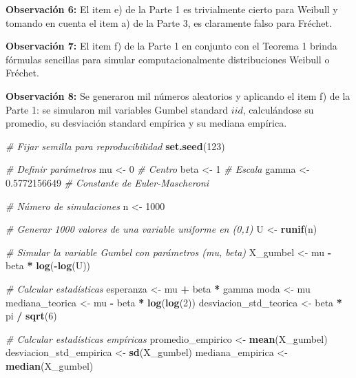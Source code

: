 \documentclass[
]{book}
\newenvironment{Shaded}{\begin{snugshade}}{\end{snugshade}}
\newcommand{\CommentTok}[1]{\textcolor[rgb]{0.56,0.35,0.01}{\textit{#1}}}
\newcommand{\DecValTok}[1]{\textcolor[rgb]{0.00,0.00,0.81}{#1}}
\newcommand{\FloatTok}[1]{\textcolor[rgb]{0.00,0.00,0.81}{#1}}
\newcommand{\FunctionTok}[1]{\textcolor[rgb]{0.13,0.29,0.53}{\textbf{#1}}}
\newcommand{\NormalTok}[1]{#1}
\newcommand{\OtherTok}[1]{\textcolor[rgb]{0.56,0.35,0.01}{#1}}
\newcommand{\SpecialCharTok}[1]{\textcolor[rgb]{0.81,0.36,0.00}{\textbf{#1}}}
\theoremstyle{definition}
\theoremstyle{definition}
\theoremstyle{definition}
\theoremstyle{definition}
\theoremstyle{remark}
\begin{document}
\textbf{Observación 6:} El item e) de la Parte 1 es
trivialmente cierto para Weibull y tomando en
cuenta el item a) de la Parte 3, es claramente falso
para Fréchet.

\textbf{Observación 7:} El item f) de la Parte 1 en
conjunto con el Teorema 1 brinda fórmulas
sencillas para simular computacionalmente
distribuciones Weibull o Fréchet.

\textbf{Observación 8:} Se generaron mil números aleatorios y aplicando el
item f) de la Parte 1: se simularon mil variables
Gumbel standard \(iid\), calculándose su promedio, su
desviación standard empírica y su mediana
empírica.

\begin{Shaded}
\begin{Highlighting}[]
\CommentTok{\# Fijar semilla para reproducibilidad}
\FunctionTok{set.seed}\NormalTok{(}\DecValTok{123}\NormalTok{)}

\CommentTok{\# Definir parámetros}
\NormalTok{mu }\OtherTok{\textless{}{-}} \DecValTok{0}       \CommentTok{\# Centro}
\NormalTok{beta }\OtherTok{\textless{}{-}} \DecValTok{1}     \CommentTok{\# Escala}
\NormalTok{gamma }\OtherTok{\textless{}{-}} \FloatTok{0.5772156649}  \CommentTok{\# Constante de Euler{-}Mascheroni}

\CommentTok{\# Número de simulaciones}
\NormalTok{n }\OtherTok{\textless{}{-}} \DecValTok{1000}

\CommentTok{\# Generar 1000 valores de una variable uniforme en (0,1)}
\NormalTok{U }\OtherTok{\textless{}{-}} \FunctionTok{runif}\NormalTok{(n)}

\CommentTok{\# Simular la variable Gumbel con parámetros (mu, beta)}
\NormalTok{X\_gumbel }\OtherTok{\textless{}{-}}\NormalTok{ mu }\SpecialCharTok{{-}}\NormalTok{ beta }\SpecialCharTok{*} \FunctionTok{log}\NormalTok{(}\SpecialCharTok{{-}}\FunctionTok{log}\NormalTok{(U))}

\CommentTok{\# Calcular estadísticas}
\NormalTok{esperanza }\OtherTok{\textless{}{-}}\NormalTok{ mu }\SpecialCharTok{+}\NormalTok{ beta }\SpecialCharTok{*}\NormalTok{ gamma}
\NormalTok{moda }\OtherTok{\textless{}{-}}\NormalTok{ mu}
\NormalTok{mediana\_teorica }\OtherTok{\textless{}{-}}\NormalTok{ mu }\SpecialCharTok{{-}}\NormalTok{ beta }\SpecialCharTok{*} \FunctionTok{log}\NormalTok{(}\FunctionTok{log}\NormalTok{(}\DecValTok{2}\NormalTok{))}
\NormalTok{desviacion\_std\_teorica }\OtherTok{\textless{}{-}}\NormalTok{ beta }\SpecialCharTok{*}\NormalTok{ pi }\SpecialCharTok{/} \FunctionTok{sqrt}\NormalTok{(}\DecValTok{6}\NormalTok{)}

\CommentTok{\# Calcular estadísticas empíricas}
\NormalTok{promedio\_empirico }\OtherTok{\textless{}{-}} \FunctionTok{mean}\NormalTok{(X\_gumbel)}
\NormalTok{desviacion\_std\_empirica }\OtherTok{\textless{}{-}} \FunctionTok{sd}\NormalTok{(X\_gumbel)}
\NormalTok{mediana\_empirica }\OtherTok{\textless{}{-}} \FunctionTok{median}\NormalTok{(X\_gumbel)}
\end{Highlighting}
\end{Shaded}
\end{document}
